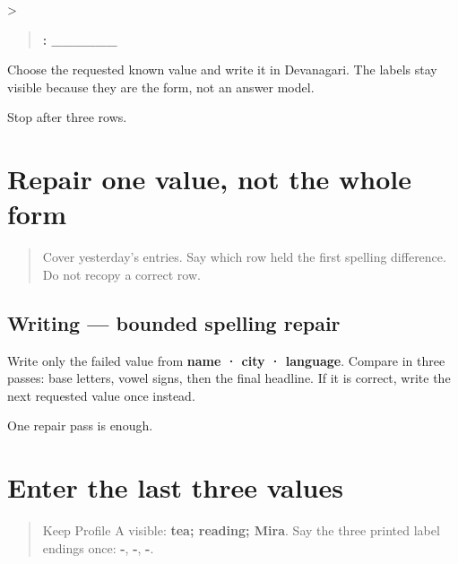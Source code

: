 >

\begin{quote}
\textbf{: \_\_\_\_\_\_}
\end{quote}

Choose the requested known value and write it in Devanagari. The labels stay visible because they are the form, not an answer model.

\begin{tcolorbox}[breakable,colback=teal!4,colframe=teal!35!black,title={Before you move on}]
Stop after three rows.
\end{tcolorbox}
\section[\mr{अरुण} · \mr{पुणे} · \mr{मराठी}]{Repair one value, not the whole form}

\label{lesson:MR-A1F07-first-three-spelling}



\begin{quote}
Cover yesterday's entries. Say which row held the first spelling difference. Do not recopy a correct row.
\end{quote}

\subsection*{Writing — bounded spelling repair}
Write only the failed value from \textbf{name · city · language}. Compare in three passes: base letters, vowel signs, then the final headline. If it is correct, write the next requested value once instead.

\begin{tcolorbox}[breakable,colback=teal!4,colframe=teal!35!black,title={Before you move on}]
One repair pass is enough.
\end{tcolorbox}
\section[\mr{आवडते} \mr{पेय}: \_\_\_ · \mr{आवडती} \mr{कृती}: \_\_\_ · \mr{मित्राचे} …]{Enter the last three values}

\label{lesson:MR-A1F08-last-three-supported}



\begin{quote}
Keep Profile A visible: \textbf{tea; reading; Mira}. Say the three printed label endings once: \textbf{-}, \textbf{-}, \textbf{-}.
\end{quote}


